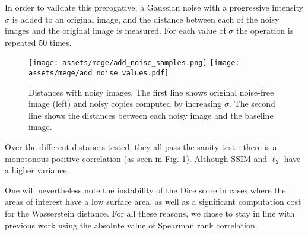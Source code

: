 In order to validate this prerogative, a Gaussian noise with a progressive intensity $\sigma$ is added to an original image, and the distance between each of the noisy images and the original image is measured. For each value of $\sigma$ the operation is repeated 50 times.

\begin{figure}[h]
  \centering
  \texttt{[image: assets/mege/add\_noise\_samples.png]}
  \texttt{[image: assets/mege/add\_noise\_values.pdf]}
  \caption{
    Distances with noisy images.
    The first line shows original noise-free image (left) and noisy copies computed by increasing $\sigma$. The second line shows the distances between each noisy image and the baseline image.
    }
  \label{dist:noise}
\end{figure}
Over the different distances tested, they all pass the sanity test : there is a monotonous positive correlation (as seen in Fig. \ref{dist:noise}). Although SSIM and $\ell_2$ have a higher variance.

One will nevertheless note the instability of the Dice score in cases where the areas of interest have a low surface area, as well as a significant computation cost for the Wasserstein distance. For all these reasons, we chose to stay in line with previous work using the absolute value of Spearman rank correlation.

